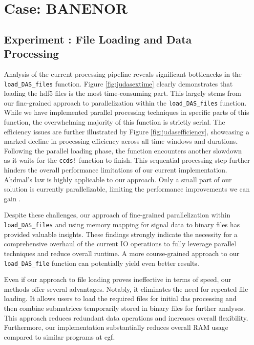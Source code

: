 \section{Case: BANENOR}
\label{disc:banenor}

\subsection{Experiment : File Loading and Data Processing}

Analysis of the current processing pipeline reveals significant bottlenecks in the \texttt{load\_DAS\_files} function. Figure \ref{fig:judasextime} clearly demonstrates that loading the \acrshort{hdf5} files is the most time-consuming part. This largely stems from our fine-grained approach to parallelization within the \texttt{load\_DAS\_files} function. While we have implemented parallel processing techniques in specific parts of this function, the overwhelming majority of this function is strictly serial. The efficiency issues are further illustrated by Figure \ref{fig:judasefficiency}, showcasing a marked decline in processing efficiency across all time windows and durations.
Following the parallel loading phase, the function encounters another slowdown as it waits for the \texttt{ccds!} function to finish. This sequential processing step further hinders the overall performance limitations of our current implementation. Ahdmal's law is highly applicable to our approach. Only a small part of our solution is currently parallelizable, limiting the performance improvements we can gain \cite{hill2008amdahl}.

Despite these challenges, our approach of fine-grained parallelization within \texttt{load\_DAS\_files} and using memory mapping for signal data to binary files has provided valuable insights. These findings strongly indicate the necessity for a comprehensive overhaul of the current IO operations to fully leverage parallel techniques and reduce overall runtime. A more course-grained approach to our \texttt{load\_DAS\_file} function can potentially yield even better results.

Even if our approach to file loading proves ineffective in terms of speed, our methods offer several advantages. Notably, it eliminates the need for repeated file loading. It allows users to load the required files for initial \acrshort{das} processing and then combine submatrices temporarily stored in binary files for further analyses. This approach reduces redundant data operations and increases overall flexibility. Furthermore, our implementation substantially reduces overall RAM usage compared to similar programs at \acrshort{cgf}. 

